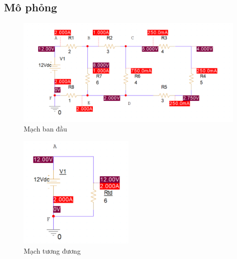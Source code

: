 \pagebreak

\subsection{Mô phỏng}
\begin{figure}[!htbp]
    \centering
    \includegraphics[width=1\textwidth]{graphics/ex2/f2.png}
    \caption{Mạch ban đầu}
\end{figure}

\begin{figure}[!htbp]
    \centering
    \includegraphics[width=0.5\textwidth]{graphics/ex2/f6.png}
    \caption{Mạch tương đương}
\end{figure}
\FloatBarrier